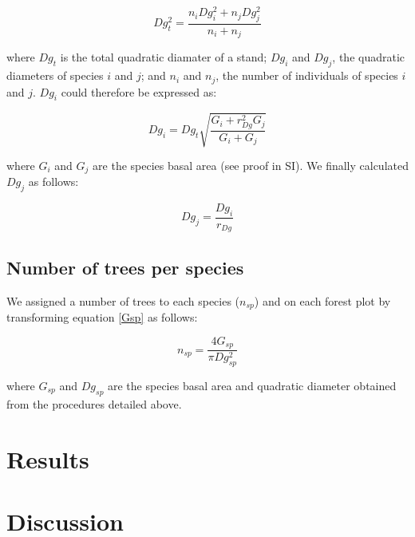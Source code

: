\documentclass[a4paper]{article}
\begin{document}
\begin{enumerate}
  \begin{equation}\label{}
    Dg_t^2 = \frac{n_iDg_i^2 + n_jDg_j^2}{n_i + n_j}
  \end{equation}

  where $Dg_t$ is the total quadratic diamater of a stand; $Dg_i$ and $Dg_j$, the quadratic diameters of species $i$ and $j$; and $n_i$ and $n_j$, the number of individuals of species $i$ and $j$. $Dg_i$ could therefore be expressed as:

  \begin{equation}\label{}
    Dg_i = Dg_t\sqrt{\frac{G_i + r_{Dg}^2G_j}{G_i + G_j}}
  \end{equation}

  where $G_i$ and $G_j$ are the species basal area (see proof in SI). We finally calculated $Dg_j$ as follows:

  \begin{equation}\label{}
    Dg_j = \frac{Dg_i}{r_{Dg}}
  \end{equation}

\end{enumerate}


\subsection*{Number of trees per species}

\noindent We assigned a number of trees to each species ($n_{sp}$) and on each forest plot by transforming equation \ref{Gsp} as follows:

\begin{equation}\label{}
  n_{sp} = \frac{4G_{sp}}{\pi Dg_{sp}^2}
\end{equation}

\noindent where $G_{sp}$ and $Dg_{sp}$ are the species basal area and quadratic diameter obtained from the procedures detailed above.

\section*{Results}

\section*{Discussion}
\end{document}
